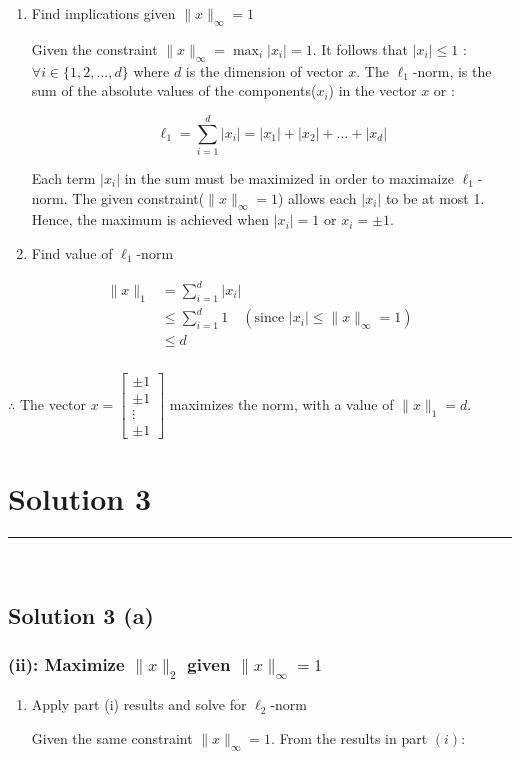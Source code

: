 \documentclass{article}
\begin{document}
\begin{enumerate}
  \item Find implications given $\|x\|_{\infty}=1$

\begin{flushleft}
Given the constraint $\|x\|_{\infty} = \max_{i} |x_i| = 1$. It follows that $|x_i| \le 1$ : $\forall i \in \{1,2,...,d\}$ where $d$ is the dimension of vector $x$.
The $\ell_1$-norm, is the sum of the absolute values of the components($x_i$) in the vector $x$ or :
\end{flushleft}

$$\ell_1 = \sum_{i=1}^d |x_i| = |x_1| + |x_2| + \ldots + |x_d|$$ 
\begin{flushleft}
Each term $|x_i|$ in the sum must be maximized in order to maximaize $\ell_1$-norm. The given constraint($\|x\|_{\infty}=1$) allows each $|x_i|$ to be at most 1. Hence, the maximum is achieved when $|x_i|=1$ or $x_i=\pm1$.
\end{flushleft}
  \item Find value of $\ell_1$-norm
\end{enumerate}
\begin{align*}
    \|x\|_1 &= \sum_{i=1}^d |x_i| \\
    &\le \sum_{i=1}^d 1 \quad (\text{since } |x_i| \le \|x\|_{\infty} = 1) \\
    &\le d
\end{align*}

\subsubsection*{\normalfont}{$\therefore$ The vector $x = \begin{bmatrix} \pm 1 \\ \pm 1 \\ \vdots \\ \pm 1 \end{bmatrix}$ maximizes the norm, with a value of $\|x\|_1 = d$.}

\newpage

\section*{Solution 3}
\noindent\rule{\textwidth}{0.4pt}\\
\subsection*{Solution 3 (a)}
\subsubsection*{(ii): Maximize $\|x\|_2$ given $\|x\|_{\infty}=1$}
\begin{enumerate}
  \item \parbox{\textwidth}{Apply part (i) results and solve for $\ell_2$-norm}
\begin{flushleft}
  Given the same constraint $\|x\|_{\infty} = 1$. From the results in part $(i)$:
\end{flushleft}
\end{enumerate}
\end{document}
